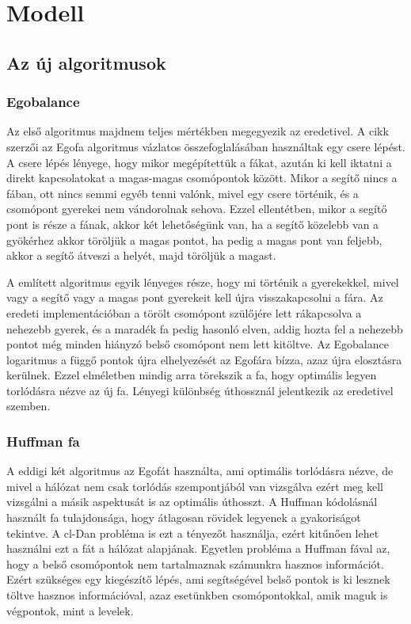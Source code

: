 \documentclass[12pt]{report}
\begin{document}
\chapter{Modell}

\section{Az új algoritmusok}

\subsection{Egobalance}

Az első algoritmus majdnem teljes mértékben megegyezik az eredetivel.
A cikk szerzői az Egofa algoritmus vázlatos összefoglalásában használtak egy csere lépést.
A csere lépés lényege, hogy mikor megépítettük a fákat, azután ki kell iktatni a direkt kapcsolatokat a magas-magas csomópontok között.
Mikor a segítő nincs a fában, ott nincs semmi egyéb tenni valónk, mivel egy csere történik, és a csomópont gyerekei nem vándorolnak sehova.
Ezzel ellentétben, mikor a segítő pont is része a fának, akkor két lehetőségünk van, ha a segítő közelebb van a gyökérhez akkor töröljük a magas pontot, ha pedig a magas pont van feljebb, akkor a segítő átveszi a helyét, majd töröljük a magast.

A említett algoritmus egyik lényeges része, hogy mi történik a gyerekekkel, mivel vagy a segítő vagy a magas pont gyerekeit kell újra visszakapcsolni a fára.
Az eredeti implementációban a törölt csomópont szülőjére lett rákapcsolva a nehezebb gyerek, és a maradék fa pedig hasonló elven, addig hozta fel a nehezebb pontot még minden hiányzó belső csomópont nem lett kitöltve. Az Egobalance logaritmus a függő pontok újra elhelyezését az Egofára bízza, azaz újra elosztásra kerülnek.
Ezzel elméletben mindig arra törekszik a fa, hogy optimális legyen torlódásra nézve az új fa.
Lényegi különbség úthossznál jelentkezik az eredetivel szemben.

\subsection{Huffman fa}

A eddigi két algoritmus az Egofát használta, ami optimális torlódásra nézve, de mivel a hálózat nem csak torlódás szempontjából van vizsgálva ezért meg kell vizsgálni a másik aspektusát is az optimális úthosszt.
A Huffman kódolásnál használt fa tulajdonsága, hogy átlagosan rövidek legyenek a gyakoriságot tekintve.
A cl-Dan probléma is ezt a tényezőt használja, ezért kitűnően lehet használni ezt a fát a hálózat alapjának.
Egyetlen probléma a Huffman fával az, hogy a belső csomópontok nem tartalmaznak számunkra hasznos információt.
Ezért szükséges egy kiegészítő lépés, ami segítségével belső pontok is ki lesznek töltve hasznos információval, azaz esetünkben csomópontokkal, amik maguk is végpontok, mint a levelek.
\end{document}
